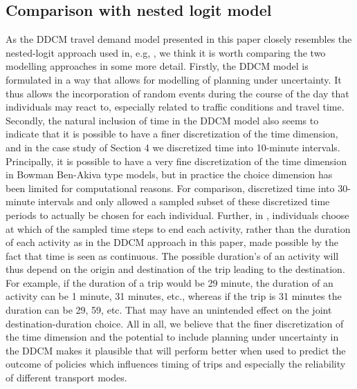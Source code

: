 


\subsection{Comparison with nested logit model}
As the DDCM travel demand model presented in this paper closely resembles the nested-logit approach used in, e.g, \citet{bowman2001}, we think it is worth comparing the two modelling approaches in some more detail. Firstly, the DDCM model is formulated in a way that allows for modelling of planning under uncertainty. It thus allows the incorporation of random events during the course of the day that individuals may react to, especially related to traffic conditions and travel time. Secondly, the natural inclusion of time in the DDCM model also seems to indicate that it is possible to have a finer discretization of the time dimension, and in the case study of Section 4 we discretized time into 10-minute intervals. Principally, it is possible to have a very fine discretization of the time dimension in Bowman Ben-Akiva type models, but in practice the choice dimension has been limited for computational reasons. For comparison, \citet{bradley2010sacsim} discretized time into 30-minute intervals and only allowed a sampled subset of these discretized time periods to actually be chosen for each individual. Further, in \citet{bradley2010sacsim}, individuals choose at which of the sampled time steps to end each activity, rather than the duration of each activity as in the DDCM approach in this paper, made possible by the fact that time is seen as continuous. The possible duration's of an activity will thus depend on the origin and destination of the trip leading to the destination. For example, if the duration of a trip would be 29 minute, the duration of an activity can be 1 minute, 31 minutes, etc., whereas if the trip is 31 minutes the duration can be 29, 59, etc. That may have an unintended effect on the joint destination-duration choice. All in all, we believe that the finer discretization of the time dimension and the potential to include planning under uncertainty in the DDCM makes it plausible that will perform better when used to predict the outcome of policies which influences timing of trips and especially the reliability of different transport modes. 

